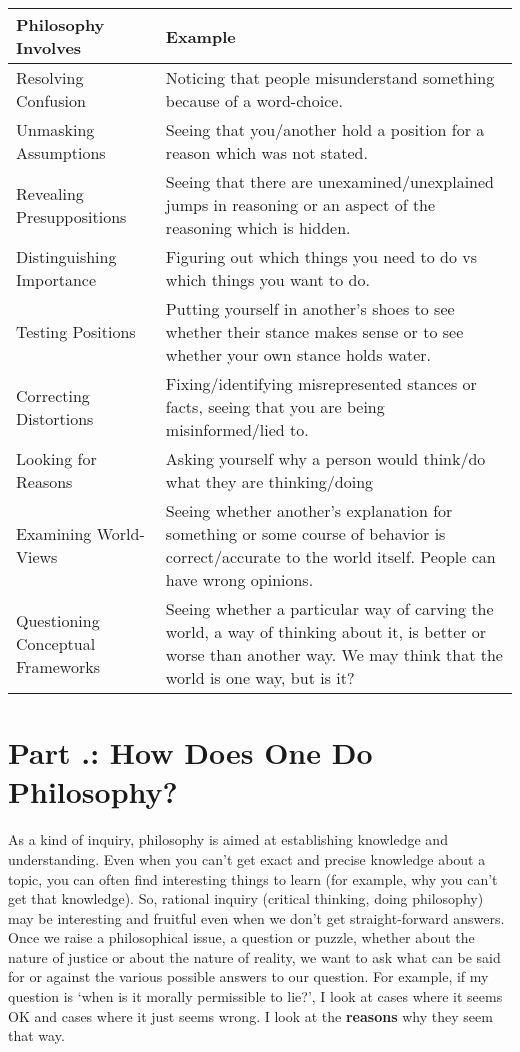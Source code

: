 \begin{tabular}{p{2in}|p{3.5in}}\hline
Philosophy Involves&Example\\\hline
Resolving Confusion &Noticing that people misunderstand something because of a word-choice.\\\hline
Unmasking Assumptions &Seeing that you/another hold a position for a reason which was not stated.\\\hline
Revealing Presuppositions &Seeing that there are unexamined/unexplained jumps in reasoning or an aspect of the reasoning which is hidden.\\\hline
Distinguishing Importance &Figuring out which things you need to do vs which things you want to do.\\\hline
Testing Positions &Putting yourself in another's shoes to see whether their stance makes sense or to see whether your own stance holds water.\\\hline
Correcting Distortions &Fixing/identifying misrepresented stances or facts, seeing that you are being misinformed/lied to.\\\hline
Looking for Reasons &Asking yourself why a person would think/do what they are thinking/doing\\\hline
Examining World-Views &Seeing whether another's explanation for something or some course of behavior is correct/accurate to the world itself. People can have wrong opinions.\\ \hline
Questioning Conceptual Frameworks &Seeing whether a particular way of carving the world, a way of thinking about it, is better or worse than another way. We may think that the world is one way, but is it?
\end{tabular}

\section{Part \thechapcount.\theseccount: How Does One Do Philosophy?}
\label{s:p1.1}
As a kind of inquiry, philosophy is aimed at establishing knowledge and understanding. Even when you can't get exact and precise knowledge about a topic, you can often find interesting things to learn (for example, why you can't get that knowledge). So, rational inquiry (critical thinking, doing philosophy) may be interesting and fruitful even when we don't get straight-forward answers. Once we raise a philosophical issue, a question or puzzle, whether about the nature of justice or about the nature of reality, we want to ask what can be said for or against the various possible answers to our question. For example, if my question is `when is it morally permissible to lie?', I look at cases where it seems OK and cases where it just seems wrong. I look at the \textbf{reasons} why they seem that way.

